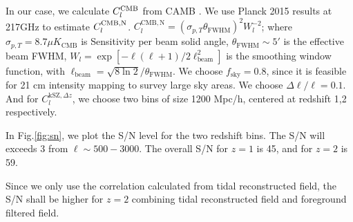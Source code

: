 In our case, we calculate $C_l^\mathrm{CMB}$ from CAMB \cite{CAMB}. 
We use Planck 2015 results \cite{Planck2015} at 217GHz to estimate $C_l^\mathrm{CMB,N}$.
$C_l^\mathrm{CMB,N}=(\sigma_{p,T}\theta_\mathrm{FWHM})^2W_l^{-2}$;  
where $\sigma_{p,T}=8.7\mu K_\mathrm{CMB}$ is Sensitivity per beam solid angle, 
$\theta_\mathrm{FWHM}\sim 5'$ is the effective beam FWHM, 
$W_l=\exp[-\ell(\ell+1)/2\ell^2_\mathrm{beam}]$ is the smoothing window function, 
with $\ell _\mathrm{beam}=\sqrt{8\ln2}/\theta_\mathrm{FWHM}$. 
We choose $f_\mathrm{sky}=0.8$, since it is feasible for 21 cm intensity mapping to survey large sky areas. 
We choose $\Delta \ell/\ell=0.1$. 
And for $C_l^{\mathrm{kSZ},\Delta z}$, we choose two bins of size 1200 Mpc/h, centered at redshift 1,2 respectively.

In Fig.\ref{fig:sn}, we plot the S/N level for the two redshift bins. 
The S/N will exceeds 3 from $\ell \sim 500-3000$. 
The overall S/N for $z=1$ is 45, and for $z=2$ is 59. 

Since we only use the correlation calculated from tidal reconstructed field, the S/N shall be higher for $z=2$  
combining tidal reconstructed field and foreground filtered field. 

